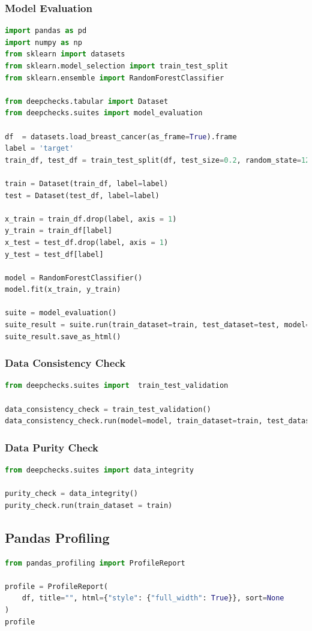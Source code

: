 \subsubsection{Model Evaluation}
\begin{lstlisting}[language=Python]
import pandas as pd
import numpy as np
from sklearn import datasets
from sklearn.model_selection import train_test_split
from sklearn.ensemble import RandomForestClassifier

from deepchecks.tabular import Dataset
from deepchecks.suites import model_evaluation

df  = datasets.load_breast_cancer(as_frame=True).frame
label = 'target'
train_df, test_df = train_test_split(df, test_size=0.2, random_state=123)

train = Dataset(train_df, label=label)
test = Dataset(test_df, label=label)

x_train = train_df.drop(label, axis = 1)
y_train = train_df[label]
x_test = test_df.drop(label, axis = 1)
y_test = test_df[label]

model = RandomForestClassifier()
model.fit(x_train, y_train)

suite = model_evaluation()
suite_result = suite.run(train_dataset=train, test_dataset=test, model=model)
suite_result.save_as_html()
\end{lstlisting}

\subsubsection{Data Consistency Check}
\begin{lstlisting}[language=Python]
from deepchecks.suites import  train_test_validation

data_consistency_check = train_test_validation()
data_consistency_check.run(model=model, train_dataset=train, test_dataset=test)
\end{lstlisting}

\subsubsection{Data Purity Check}
\begin{lstlisting}[language=Python]
from deepchecks.suites import data_integrity

purity_check = data_integrity()
purity_check.run(train_dataset = train)
\end{lstlisting}

\subsection{Pandas Profiling}
\begin{lstlisting}[language=Python]
from pandas_profiling import ProfileReport

profile = ProfileReport(
    df, title="", html={"style": {"full_width": True}}, sort=None
)
profile
\end{lstlisting}

